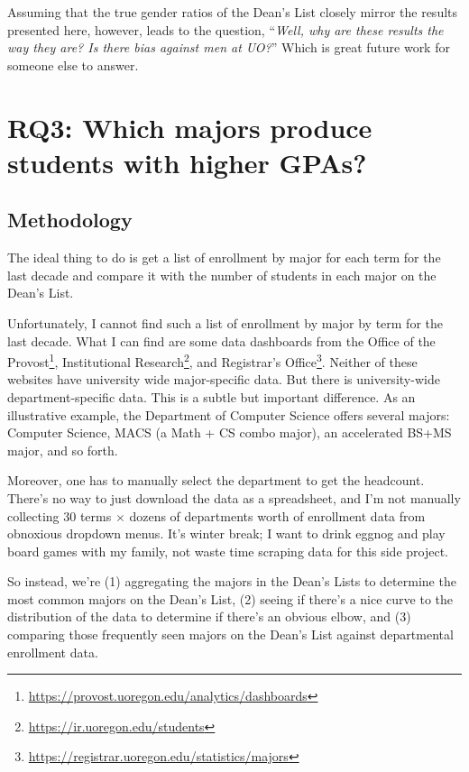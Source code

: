 \documentclass[10]{article}
\begin{document}
Assuming that the true gender ratios of the Dean's List closely mirror the results presented here, however, leads to the question, ``\textit{Well, why are these results the way they are? Is there bias against men at UO?}'' Which is great future work for someone else to answer.

\section{RQ3: Which majors produce students with higher GPAs?}

\subsection{Methodology}

The ideal thing to do is get a list of enrollment by major for each term for the last decade and compare it with the number of students in each major on the Dean's List.

Unfortunately, I cannot find such a list of enrollment by major by term for the last decade. What I can find are some data dashboards from the Office of the Provost\footnote{\url{https://provost.uoregon.edu/analytics/dashboards}}, Institutional Research\footnote{\url{https://ir.uoregon.edu/students}}, and Registrar's Office\footnote{\url{https://registrar.uoregon.edu/statistics/majors}}. Neither of these websites have university wide major-specific data. But there is university-wide department-specific data. This is a subtle but important difference. As an illustrative example, the Department of Computer Science offers several majors: Computer Science, MACS (a Math + CS combo major), an accelerated BS+MS major, and so forth.

Moreover, one has to manually select the department to get the headcount. There's no way to just download the data as a spreadsheet, and I'm not manually collecting 30 terms $\times$ dozens of departments worth of enrollment data from obnoxious dropdown menus. It's winter break; I want to drink eggnog and play board games with my family, not waste time scraping data for this side project.

So instead, we're (1) aggregating the majors in the Dean's Lists to determine the most common majors on the Dean's List, (2) seeing if there's a nice curve to the distribution of the data to determine if there's an obvious elbow, and (3) comparing those frequently seen majors on the Dean's List against departmental enrollment data.
\end{document}
